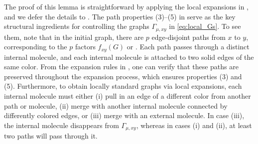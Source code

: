 

The proof of this lemma is straightforward by applying the local expansions in , and we defer the details to . 
The path properties (3)--(5) in  serve as the key structural ingredients for controlling the graphs $\Gamma_{\mu,xy}$ in \eqref{eq:local_Gs}.
To see them, note that in the initial graph, there are $p$ edge-disjoint paths from $x$ to $y$, corresponding to the $p$ factors $f_{xy}(G)$ or . Each path passes through a distinct internal molecule, and each internal molecule is attached to two solid edges of the same color. From the expansion rules in , one can verify that these paths are preserved throughout the expansion process, which ensures properties (3) and (5).
Furthermore, to obtain locally standard graphs via local expansions, each internal molecule must either (i) pull in an edge of a different color from another path or molecule, (ii) merge with another internal molecule connected by differently colored edges, or (iii) merge with an external molecule. In case (iii), the internal molecule disappears from $\Gamma_{\mu,xy}$, whereas in cases (i) and (ii), at least two paths will pass through it.





